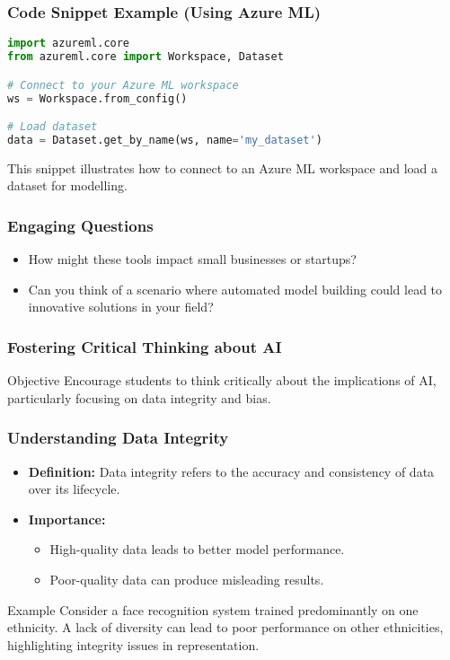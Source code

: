 \documentclass[aspectratio=169]{beamer}
\begin{document}
\begin{frame}[fragile]
    \frametitle{Code Snippet Example (Using Azure ML)}
    \begin{lstlisting}[language=Python]
import azureml.core
from azureml.core import Workspace, Dataset

# Connect to your Azure ML workspace
ws = Workspace.from_config()

# Load dataset
data = Dataset.get_by_name(ws, name='my_dataset')
    \end{lstlisting}
    This snippet illustrates how to connect to an Azure ML workspace and load a dataset for modelling.
\end{frame}

\begin{frame}
    \frametitle{Engaging Questions}
    \begin{itemize}
        \item How might these tools impact small businesses or startups?
        \item Can you think of a scenario where automated model building could lead to innovative solutions in your field?
    \end{itemize}
\end{frame}

\begin{frame}[fragile]
    \frametitle{Fostering Critical Thinking about AI}
    \begin{block}{Objective}
        Encourage students to think critically about the implications of AI, particularly focusing on data integrity and bias.
    \end{block}
\end{frame}

\begin{frame}[fragile]
    \frametitle{Understanding Data Integrity}
    \begin{itemize}
        \item \textbf{Definition:} Data integrity refers to the accuracy and consistency of data over its lifecycle.
        \item \textbf{Importance:} 
        \begin{itemize}
            \item High-quality data leads to better model performance.
            \item Poor-quality data can produce misleading results.
        \end{itemize}
    \end{itemize}
    \begin{block}{Example}
        Consider a face recognition system trained predominantly on one ethnicity. A lack of diversity can lead to poor performance on other ethnicities, highlighting integrity issues in representation.
    \end{block}
\end{frame}
\end{document}
